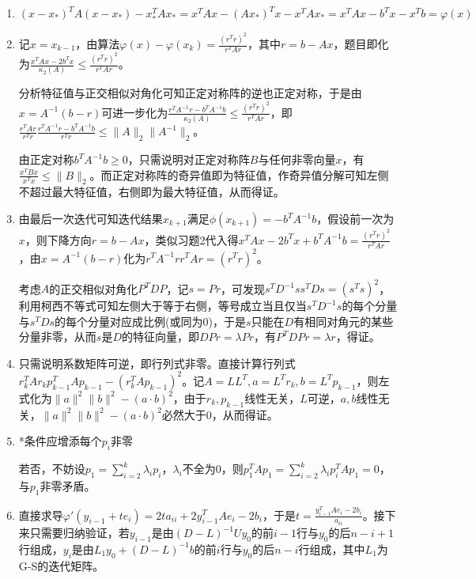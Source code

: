 \documentclass[a4paper,UTF8,fontset=windows]{ctexart}
\begin{document}
\begin{enumerate}
\item
$(x-x_*)^TA(x-x_*)-x_*^TAx_*=x^TAx-(Ax_*)^Tx-x^TAx_*=x^TAx-b^Tx-x^Tb=\varphi(x)$

\item
记$x=x_{k-1}$，由算法$\varphi(x)-\varphi(x_k)=\frac{(r^Tr)^2}{r^TAr}$，其中$r=b-Ax$，题目即化为$\frac{x^TAx-2b^Tx}{\kappa_2(A)}\le\frac{(r^Tr)^2}{r^TAr}$。

分析特征值与正交相似对角化可知正定对称阵的逆也正定对称，于是由$x=A^{-1}(b-r)$可进一步化为$\frac{r^TA^{-1}r-b^TA^{-1}b}{\kappa_2(A)}\le\frac{(r^Tr)^2}{r^TAr}$，即$\frac{r^TAr}{r^Tr}\frac{r^TA^{-1}r-b^TA^{-1}b}{r^Tr}\le\|A\|_2\|A^{-1}\|_2$。

由正定对称$b^TA^{-1}b\ge0$，只需说明对正定对称阵$B$与任何非零向量$x$，有$\frac{x^TBx}{x^Tx}\le\|B\|_2$。而正定对称阵的奇异值即为特征值，作奇异值分解可知左侧不超过最大特征值，右侧即为最大特征值，从而得证。

\item
由最后一次迭代可知迭代结果$x_{k+1}$满足$\phi(x_{k+1})=-b^TA^{-1}b$，假设前一次为$x$，则下降方向$r=b-Ax$，类似习题2代入得$x^TAx-2b^Tx+b^TA^{-1}b=\frac{(r^Tr)^2}{r^TAr}$，由$x=A^{-1}(b-r)$化为$r^TA^{-1}rr^TAr=(r^Tr)^2$。

考虑$A$的正交相似对角化$P^TDP$，记$s=Pr$，可发现$s^TD^{-1}ss^TDs=(s^Ts)^2$，利用柯西不等式可知左侧大于等于右侧，等号成立当且仅当$s^TD^{-1}s$的每个分量与$s^TDs$的每个分量对应成比例(或同为0)，于是$s$只能在$D$有相同对角元的某些分量非零，从而$s$是$D$的特征向量，即$DPr=\lambda Pr$，有$P^TDPr=\lambda r$，得证。

\item
只需说明系数矩阵可逆，即行列式非零。直接计算行列式$r_k^TAr_kp_{k-1}^TAp_{k-1}-(r_k^TAp_{k-1})^2$。记$A=LL^T,a=L^Tr_k,b=L^Tp_{k-1}$，则左式化为$\|a\|^2\|b\|^2-(a\cdot b)^2$，由于$r_k,p_{k-1}$线性无关，$L$可逆，$a,b$线性无关，$\|a\|^2\|b\|^2-(a\cdot b)^2$必然大于0，从而得证。

\item
*条件应增添每个$p_i$非零

若否，不妨设$p_1=\sum_{i=2}^k\lambda_ip_i$，$\lambda_i$不全为0，则$p_1^TAp_1=\sum_{i=2}^k\lambda_ip_i^TAp_1=0$，与$p_1$非零矛盾。

\item
直接求导$\varphi'(y_{i-1}+te_i)=2ta_{ii}+2y_{i-1}^TAe_i-2b_i$，于是$t=\frac{y_{i-1}^TAe_i-2b_i}{a_{ii}}$。接下来只需要归纳验证，若$y_{i-1}$是由$(D-L)^{-1}Uy_0$的前$i-1$行与$y_0$的后$n-i+1$行组成，$y_i$是由$L_1y_0+(D-L)^{-1}b$的前$i$行与$y_0$的后$n-i$行组成，其中$L_1$为G-S的迭代矩阵。


\end{enumerate}
\end{document}
